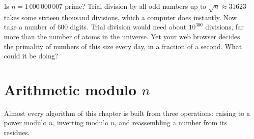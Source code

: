 \begin{think}
Is $n=1\,000\,000\,007$ prime? Trial division by all odd numbers up to $\sqrt n\approx31623$ takes some sixteen thousand divisions, which a computer does instantly. Now take a number of $600$ digits. Trial division would need about $10^{300}$ divisions, far more than the number of atoms in the universe.
Yet your web browser decides the primality of numbers of this size every day, in a fraction of a second. What could it be doing?
\end{think}

\section{Arithmetic modulo $n$}\label{sec:modarith}

Almost every algorithm of this chapter is built from three operations: raising to a power modulo $n$, inverting modulo $n$, and reassembling a number from its residues.

